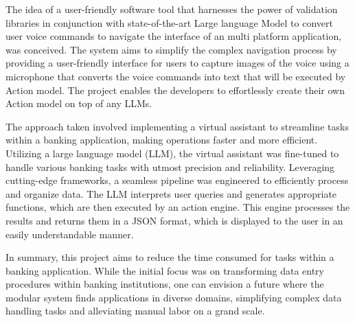 \vspace{3mm}

\noindent The idea of a user-friendly software tool that harnesses the power of validation libraries in conjunction with state-of-the-art Large language Model to convert user voice commands to navigate the interface of an multi platform application, was conceived. The system aims to simplify the complex navigation process by providing a user-friendly interface for users to capture images of the voice using a microphone that converts the voice commands into text that will be executed by Action model. The project enables the developers to effortlessly create their own Action model on top of any LLMs.

\vspace{3mm}

\noindent The approach taken involved implementing a virtual assistant to streamline tasks within a banking application, making operations faster and more efficient. Utilizing a large language model (LLM), the virtual assistant was fine-tuned to handle various banking tasks with utmost precision and reliability. Leveraging cutting-edge frameworks, a seamless pipeline was engineered to efficiently process and organize data. The LLM interprets user queries and generates appropriate functions, which are then executed by an action engine. This engine processes the results and returns them in a JSON format, which is displayed to the user in an easily understandable manner.

\vspace{3mm}

\noindent In summary, this project aims to reduce the time consumed for tasks within a banking application. While the initial focus was on transforming data entry procedures within banking institutions, one can envision a future where the modular system finds applications in diverse domains, simplifying complex data handling tasks and alleviating manual labor on a grand scale.



\tableofcontents
\printnomenclature
\listoffigures
\listoftables
\clearpage


